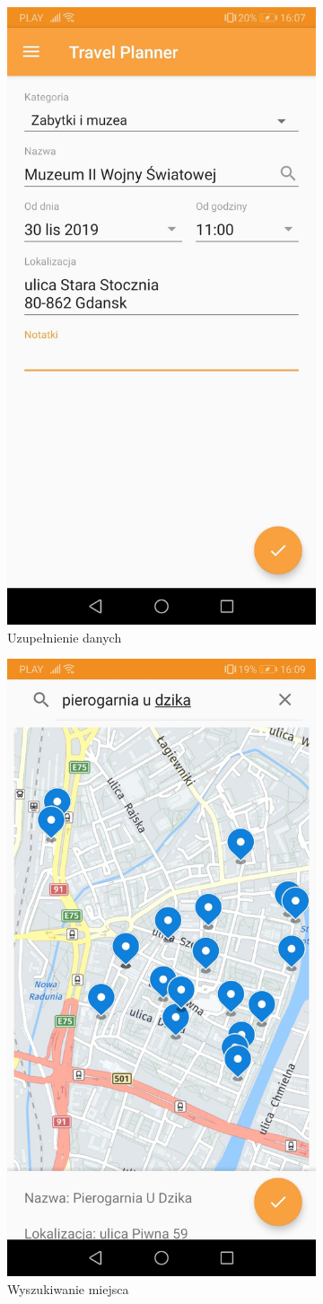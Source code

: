 \documentclass[10pt,twoside,a4paper]{report}
\begin{document}
\begin{figure}[h]
\begin{subfigure}{0.3\textwidth}
\centering
\includegraphics[width=0.9\linewidth, width=5cm]{searchPlace}
\caption{Uzupełnienie danych}
\label{fig:searchPlace}
\end{subfigure}
\begin{subfigure}{0.3\textwidth}
\centering
\includegraphics[width=0.9\linewidth, width=5cm]{searchingPlace}
\caption{Wyszukiwanie miejsca}
\label{fig:searchingPlace}
\end{subfigure}
\begin{subfigure}{0.3\textwidth}
\centering

\end{subfigure}
\end{figure}
\end{document}
